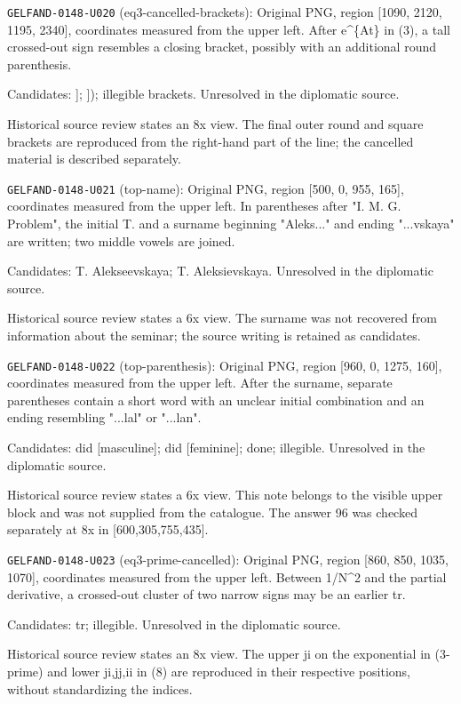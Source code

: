 \noindent\texttt{GELFAND-0148-U020} (eq3-cancelled-brackets): Original PNG, region [1090, 2120, 1195, 2340], coordinates measured from the upper left. After e\textasciicircum{}\{At\} in (3), a tall crossed-out sign resembles a closing bracket, possibly with an additional round parenthesis.\par
Candidates: ]; ]); illegible brackets. Unresolved in the diplomatic source.\par
Historical source review states an 8x view. The final outer round and square brackets are reproduced from the right-hand part of the line; the cancelled material is described separately.\par

\noindent\texttt{GELFAND-0148-U021} (top-name): Original PNG, region [500, 0, 955, 165], coordinates measured from the upper left. In parentheses after "I. M. G. Problem", the initial T. and a surname beginning "Aleks..." and ending "...vskaya" are written; two middle vowels are joined.\par
Candidates: T. Alekseevskaya; T. Aleksievskaya. Unresolved in the diplomatic source.\par
Historical source review states a 6x view. The surname was not recovered from information about the seminar; the source writing is retained as candidates.\par

\noindent\texttt{GELFAND-0148-U022} (top-parenthesis): Original PNG, region [960, 0, 1275, 160], coordinates measured from the upper left. After the surname, separate parentheses contain a short word with an unclear initial combination and an ending resembling "...lal" or "...lan".\par
Candidates: did [masculine]; did [feminine]; done; illegible. Unresolved in the diplomatic source.\par
Historical source review states a 6x view. This note belongs to the visible upper block and was not supplied from the catalogue. The answer 96 was checked separately at 8x in [600,305,755,435].\par

\noindent\texttt{GELFAND-0148-U023} (eq3-prime-cancelled): Original PNG, region [860, 850, 1035, 1070], coordinates measured from the upper left. Between 1/N\textasciicircum{}2 and the partial derivative, a crossed-out cluster of two narrow signs may be an earlier tr.\par
Candidates: tr; illegible. Unresolved in the diplomatic source.\par
Historical source review states an 8x view. The upper ji on the exponential in (3-prime) and lower ji,jj,ii in (8) are reproduced in their respective positions, without standardizing the indices.\par

